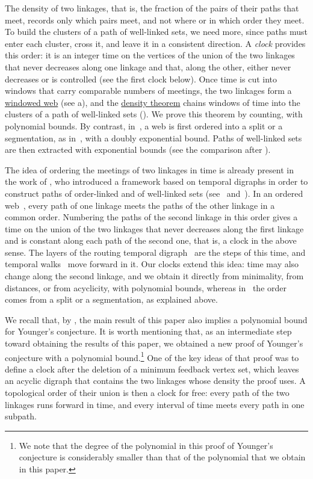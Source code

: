 \documentclass[fontsize=12pt,leading=14pt]{fullpaper}
\newcounter{step}
\begin{document}
The density of two linkages, that is, the fraction of the pairs of their paths that meet, records only which pairs meet, and not where or in which order they meet.
To build the clusters of a path of well-linked sets, we need more, since paths must enter each cluster, cross it, and leave it in a consistent direction.
A \emph{clock} provides this order: it is an integer time on the vertices of the union of the two linkages that never decreases along one linkage and that, along the other, either never decreases or is controlled (see the first clock below).
Once time is cut into windows that carry comparable numbers of meetings, the two linkages form a \hyperref[def:windowed]{windowed web} (see a), and the \hyperref[thm:density]{density theorem} chains windows of time into the clusters of a path of well-linked sets ().
We prove this theorem by counting, with polynomial bounds.
By contrast, in~\cite{HKMM26a}, a web is first ordered into a split or a segmentation, as in~\cite[Lemma~5.15]{KawarabayashiK15}, with a doubly exponential bound.
Paths of well-linked sets are then extracted with exponential bounds (see the comparison after ).

The idea of ordering the meetings of two linkages in time is already present in the work of \textcite{HKMM26a}, who introduced a framework based on temporal digraphs in order to construct paths of order-linked and of well-linked sets (see~\cite[sections~6 and~9]{HKMM26a} and~\cite[Section~3.1]{HKMM26b}).
In an ordered web~\cite[Definition~9.1]{HKMM26a}, every path of one linkage meets the paths of the other linkage in a common order.
Numbering the paths of the second linkage in this order gives a time on the union of the two linkages that never decreases along the first linkage and is constant along each path of the second one, that is, a clock in the above sense.
The layers of the routing temporal digraph~\cite[Definition~6.3]{HKMM26a} are the steps of this time, and temporal walks~\cite[Definition~6.2]{HKMM26a} move forward in it.
Our clocks extend this idea: time may also change along the second linkage, and we obtain it directly from minimality, from distances, or from acyclicity, with polynomial bounds, whereas in~\cite{HKMM26a} the order comes from a split or a segmentation, as explained above.


We recall that, by , the main result of this paper also implies a polynomial bound for Younger's conjecture. It is worth mentioning that, as an intermediate step toward obtaining the results of this paper, we obtained a new proof of Younger's conjecture with a polynomial bound.\footnote{We note that the degree of the polynomial in this proof of Younger's conjecture is considerably smaller than that of the polynomial that we obtain in this paper.} One of the key ideas of that proof was to define a clock after the deletion of a minimum feedback vertex set, which leaves an acyclic digraph  that contains the two linkages whose density the proof uses. A topological order of their union is then a clock for free: every path of the two linkages runs forward in time, and every interval of time meets every path in one subpath.
\end{document}
